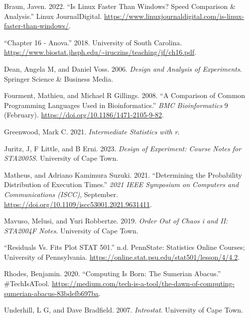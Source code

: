 \documentclass[12pt,halfline,a4paper,]{ouparticle}
\newlength{\cslhangindent}
\newenvironment{CSLReferences}[2] %
 {\begin{list}{}{%
  \setlength{\itemindent}{0pt}
  \setlength{\leftmargin}{0pt}
  \setlength{\parsep}{0pt}
  \ifodd #1
   \setlength{\leftmargin}{\cslhangindent}
   \setlength{\itemindent}{-1\cslhangindent}
  \fi
  \setlength{\itemsep}{#2\baselineskip}}}
 {\end{list}}
\begin{document}
\label{refs}
\begin{CSLReferences}{1}{0}
Braun, Javen. 2022. {``Is Linux Faster Than Windows? Speed Comparison \&
Analysis.''} Linux JournalDigital.
\url{https://www.linuxjournaldigital.com/is-linux-faster-than-windows/}.

{``Chapter 16 - Anova.''} 2018. University of South Carolina.
\url{https://www.biostat.jhsph.edu/~iruczins/teaching/jf/ch16.pdf}.

Dean, Angela M, and Daniel Voss. 2006. \emph{Design and Analysis of
Experiments}. Springer Science \& Business Media.

Fourment, Mathieu, and Michael R Gillings. 2008. {``A Comparison of
Common Programming Languages Used in Bioinformatics.''} \emph{BMC
Bioinformatics} 9 (February).
\url{https://doi.org/10.1186/1471-2105-9-82}.

Greenwood, Mark C. 2021. \emph{Intermediate Statistics with r}.

Juritz, J, F Little, and B Erni. 2023. \emph{Design of Experiment:
Course Notes for STA2005S}. University of Cape Town.

Matheus, and Adriano Kamimura Suzuki. 2021. {``Determining the
Probability Distribution of Execution Times.''} \emph{2021 IEEE
Symposium on Computers and Communications (ISCC)}, September.
\url{https://doi.org/10.1109/iscc53001.2021.9631411}.

Mavuso, Melusi, and Yuri Robbertze. 2019. \emph{Order Out of Chaos i and
II: STA2004F Notes}. University of Cape Town.

{``Residuals Vs. Fits Plot \textbar{} STAT 501.''} n.d. PennState:
Statistics Online Courses; University of Pennsylvania.
\url{https://online.stat.psu.edu/stat501/lesson/4/4.2}.

Rhodes, Benjamin. 2020. {``Computing Is Born: The Sumerian Abacus.''}
\#TechIsATool.
\url{https://medium.com/tech-is-a-tool/the-dawn-of-computing-sumerian-abacus-83bdefb697ba}.

Underhill, L G, and Dave Bradfield. 2007. \emph{Introstat}. University
of Cape Town.

\end{CSLReferences}
\end{document}
